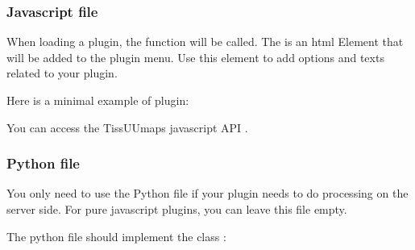\documentclass[letterpaper,10pt,english,openany,oneside]{sphinxmanual}
\begin{document}
\subsubsection{Javascript file}
\label{\detokenize{docs/starting/plugins:javascript-file}}
\sphinxAtStartPar
When loading a plugin, the function  will be called. The  is an html Element that will be added to the plugin menu. Use this element to add options and texts related to your plugin.

\sphinxAtStartPar
{}

\sphinxAtStartPar
Here is a minimal example of plugin:

\begin{sphinxVerbatim}[commandchars=\\\{\}]
 
  
 
    
      
\end{sphinxVerbatim}

\sphinxAtStartPar
You can access the TissUUmaps javascript API .


\subsubsection{Python file}
\label{\detokenize{docs/starting/plugins:python-file}}
\sphinxAtStartPar
You only need to use the Python file if your plugin needs to do processing on the server side. For pure javascript plugins, you can leave this file empty.

\sphinxAtStartPar
The python file should implement the class :

\begin{sphinxVerbatim}[commandchars=\\\{\}]
  
      
          
\end{sphinxVerbatim}
\end{document}
